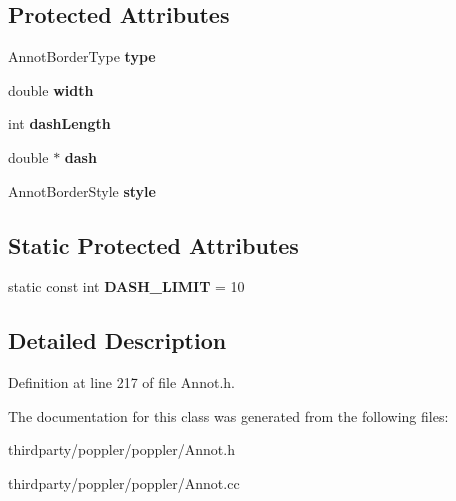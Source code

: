 \subsection*{Protected Attributes}
\begin{DoxyCompactItemize}
\item 
\mbox{\label{class_annot_border_a5e42121fd2a80991f660de642693c853}} 
Annot\+Border\+Type {\bfseries type}
\item 
\mbox{\label{class_annot_border_a5854890ca0511de65e512280d436fd50}} 
double {\bfseries width}
\item 
\mbox{\label{class_annot_border_a9786adae8fa5916f7b09474c6ad9a493}} 
int {\bfseries dash\+Length}
\item 
\mbox{\label{class_annot_border_adc6141e18ba836f4ed602b3429c91c40}} 
double $\ast$ {\bfseries dash}
\item 
\mbox{\label{class_annot_border_aa1997bb26b63d1da5b488d8eaacc373e}} 
Annot\+Border\+Style {\bfseries style}
\end{DoxyCompactItemize}
\subsection*{Static Protected Attributes}
\begin{DoxyCompactItemize}
\item 
\mbox{\label{class_annot_border_a35b294b8bf199237594fd36508ccb6eb}} 
static const int {\bfseries D\+A\+S\+H\+\_\+\+L\+I\+M\+IT} = 10
\end{DoxyCompactItemize}


\subsection{Detailed Description}


Definition at line 217 of file Annot.\+h.



The documentation for this class was generated from the following files\+:\begin{DoxyCompactItemize}
\item 
thirdparty/poppler/poppler/Annot.\+h\item 
thirdparty/poppler/poppler/Annot.\+cc\end{DoxyCompactItemize}
